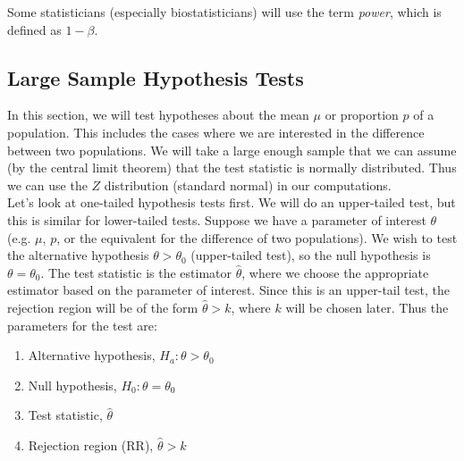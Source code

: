 \documentclass[12pt]{article}
\theoremstyle{definition}
\theoremstyle{remark}
\begin{document}
Some statisticians (especially biostatisticians) will use the term \emph{power}, which is defined as $1 - \beta$.

\subsection{Large Sample Hypothesis Tests}
In this section, we will test hypotheses about the mean $\mu$ or proportion $p$ of a population. This includes the cases where we are interested in the difference between two populations. We will take a large enough sample that we can assume (by the central limit theorem) that the test statistic is normally distributed. Thus we can use the $Z$ distribution (standard normal) in our computations. \\

Let's look at one-tailed hypothesis tests first. We will do an upper-tailed test, but this is similar for lower-tailed tests. Suppose we have a parameter of interest $\theta$ (e.g. $\mu$, $p$, or the equivalent for the difference of two populations). We wish to test the alternative hypothesis $\theta > \theta_0$ (upper-tailed test), so the null hypothesis is $\theta = \theta_0$. The test statistic is the estimator $\hat{\theta}$, where we choose the appropriate estimator based on the parameter of interest. Since this is an upper-tail test, the rejection region will be of the form $\hat{\theta} > k$, where $k$ will be chosen later. Thus the parameters for the test are:

\begin{enumerate}
\item Alternative hypothesis, $H_a: \theta > \theta_0$
\item Null hypothesis, $H_0: \theta = \theta_0$
\item Test statistic, $\hat{\theta}$
\item Rejection region (RR), $\hat{\theta} > k$
\end{enumerate}
\end{document}
